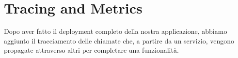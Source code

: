 \chapter{Tracing and Metrics}
Dopo aver fatto il deployment completo della nostra applicazione, abbiamo aggiunto il tracciamento delle chiamate che, a partire da un servizio, vengono propagate attraverso altri per completare una funzionalità.